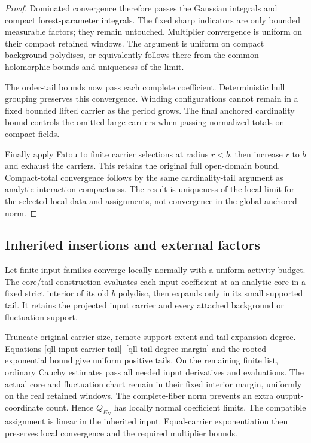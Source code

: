 \documentclass[11pt]{article}
\theoremstyle{remark}
\begin{document}
\begin{proof}
Dominated convergence therefore passes the Gaussian integrals
and compact forest-parameter integrals. The fixed sharp
indicators are only bounded measurable factors; they remain
untouched. Multiplier convergence is uniform on their compact
retained windows. The argument is uniform on compact background
polydiscs, or equivalently follows there from the common
holomorphic bounds and uniqueness of the limit.

The order-tail bounds now pass each complete coefficient.
Deterministic hull grouping preserves this convergence.
Winding configurations cannot remain in a fixed bounded
lifted carrier as the period grows. The final anchored
cardinality bound controls the omitted large carriers when
passing normalized totals on compact fields.

Finally apply Fatou to finite carrier selections at radius
\(r<b\), then increase \(r\) to \(b\) and exhaust the carriers.
This retains the original full open-domain bound. Compact-total
convergence follows by the same cardinality-tail argument as
analytic interaction compactness. The result is uniqueness of
the local limit for the selected local data and assignments,
not convergence in the global anchored norm.
\end{proof}

\subsection{Inherited insertions and external factors}
\label{qll-inherited-section}

Let finite input families converge locally normally with a
uniform activity budget. The core/tail construction evaluates
each input coefficient at an analytic core in a fixed strict
interior of its old \(b\) polydisc, then expands only in its
small supported tail. It retains the projected input carrier
and every attached background or fluctuation support.

Truncate original carrier size, remote support extent and
tail-expansion degree. Equations
\eqref{qll-input-carrier-tail}--\eqref{qll-tail-degree-margin}
and the rooted exponential bound give uniform positive tails.
On the remaining finite list, ordinary Cauchy estimates pass
all needed input derivatives and evaluations. The actual core
and fluctuation chart remain in their fixed interior margin,
uniformly on the real retained windows. The complete-fiber
norm prevents an extra output-coordinate count. Hence
\(Q_{E_N}\) has locally normal coefficient limits. The
compatible assignment is linear in the inherited input.
Equal-carrier exponentiation then preserves local convergence
and the required multiplier bounds.
\end{document}
